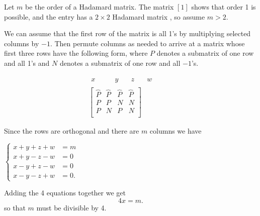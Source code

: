 \documentclass[12pt]{article}
\begin{document}
Let $m$ be the order of a Hadamard matrix. The matrix $[1]$ shows that order 1 
is possible, and the  entry has a $2 \times 2$ Hadamard matrix
, so assume $m>2$. 

We can assume that the first row of the matrix is all 1's by multiplying
selected columns by $-1$. Then permute columns as needed to arrive at a
matrix whose first three rows have the following form, where $P$ denotes a submatrix of one row
and all 1's and $N$ denotes a submatrix of one row and all $-1$'s.

$$\begin{matrix}
\begin{matrix}
x \quad  &\quad y & \quad z & \quad w
\end{matrix} &
\begin{matrix}
\quad
\end{matrix}
\\
\left[ \begin{matrix}
\overbrace{P} & \overbrace{P} &  \overbrace{P} & \overbrace{P} \\
P & P & N & N \\
P & N & P & N \\
\end{matrix} \right] 
\end{matrix}
$$

Since the rows are orthogonal and there are $m$ columns we have
\begin{center}
$\begin{cases}
x + y + z +w &= m \\
x + y - z - w &= 0 \\
x - y + z -w &= 0 \\
x - y - z + w &= 0.
\end{cases}$
\end{center}
Adding the 4 equations together we get 
$$
4x = m.
$$
so that $m$ must be divisible by 4.
\end{document}
